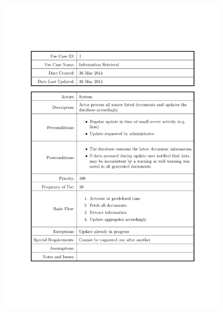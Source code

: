 \documentclass{tufte-book}
\begin{document}
\begin{figure}[h] \includegraphics[width=\linewidth]{Requirements/UseCases/001_IR.pdf}\end{figure}
\end{document}
